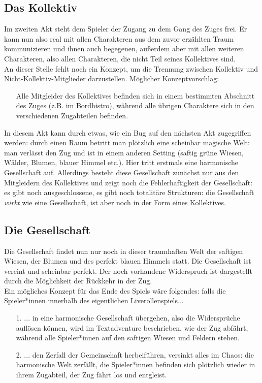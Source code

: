 \documentclass[a4paper, 12pt]{scrartcl}
\begin{document}
    \subsection{Das Kollektiv} \label{das-kollektiv}
    Im zweiten Akt steht dem Spieler der Zugang zu dem Gang des Zuges frei. 
    Er kann nun also real mit allen Charakteren aus dem zuvor erzählten Traum kommunizieren und ihnen auch begegenen, außerdem aber mit allen weiteren Charakteren, also allen Charakteren, die nicht Teil seines Kollektives sind. \\
    An dieser Stelle fehlt noch ein Konzept, um die Trennung zwischen Kollektiv und Nicht-Kollektiv-Mitglieder darzustellen.
    Möglicher Konzeptvorschlag:
    \begin{itemize}
    \item[] Alle Mitgleider des Kollektives befinden sich in einem bestimmten Abschnitt des Zuges (z.B. im Bordbistro), während alle übrigen Charaktere sich in den verschiedenen Zugabteilen befinden.
    \end{itemize}

    In diesem Akt kann durch etwas, wie ein Bug auf den nächsten Akt zugegriffen werden: 
    durch einen Raum betritt man plötzlich eine scheinbar magische Welt:
    man verlässt den Zug und ist in einem anderen Setting (saftig grüne Wiesen, Wälder, Blumen, blauer Himmel etc.).
    Hier tritt erstmals eine harmonische Gesellschaft auf. 
    Allerdings besteht diese Gesellschaft zunächst nur aus den Mitgleidern des Kollektives und zeigt noch die Fehlerhaftigkeit der Gesellschaft: es gibt noch ausgeschlossene, es gibt noch totalitäre Strukturen: die Gesellschaft \textit{wirkt} wie eine Gesellschaft, ist aber noch in der Form eines Kollektives. 

    \subsection{Die Gesellschaft} \label{die-gesellschaft}
    Die Gesellschaft findet nun nur noch in dieser traumhaften Welt der saftigen Wiesen, der Blumen und des perfekt blauen Himmels statt. 
    Die Gesellschaft ist vereint und scheinbar perfekt. 
    Der noch vorhandene Widerspruch ist dargestellt durch die Möglichkeit der Rückkehr in der Zug.\\
    Ein mögliches Konzept für das Ende des Spiels wäre folgendes: falls die Spieler*innen innerhalb des eigentlichen Liverollenspiels...
    \begin{itemize}
    \item[1.] ... in eine harmonische Gesellschaft übergehen, also die Widersprüche auflösen können, wird im Textadventure beschrieben, wie der Zug abfährt, während alle Spieler*innen auf den saftigen Wiesen und Feldern stehen. 
    \item[2.] ... den Zerfall der Gemeinschaft herbeiführen, versinkt alles im Chaos: die harmonische Welt zerfällt, die Spieler*innen befinden sich plötzlich wieder in ihrem Zugabteil, der Zug fährt los und entgleist.
    \end{itemize}
\end{document}
